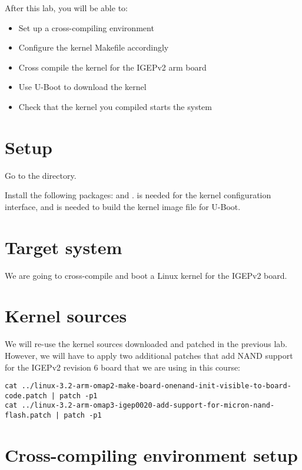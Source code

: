 
After this lab, you will be able to:
\begin{itemize}
\item Set up a cross-compiling environment
\item Configure the kernel Makefile accordingly
\item Cross compile the kernel for the IGEPv2 arm board
\item Use U-Boot to download the kernel
\item Check that the kernel you compiled starts the system
\end{itemize}

\section{Setup}

Go to the  directory.

Install the following packages:  and
.  is needed for the
 kernel configuration interface, and 
is needed to build the  kernel image file for U-Boot.

\section{Target system}

We are going to cross-compile and boot a Linux kernel for the IGEPv2
board.

\section{Kernel sources}

We will re-use the kernel sources downloaded and patched in the
previous lab. However, we will have to apply two additional patches
that add NAND support for the IGEPv2 revision 6 board that we are
using in this course:

\small
\begin{verbatim}
cat ../linux-3.2-arm-omap2-make-board-onenand-init-visible-to-board-code.patch | patch -p1
cat ../linux-3.2-arm-omap3-igep0020-add-support-for-micron-nand-flash.patch | patch -p1
\end{verbatim}
\normalsize

\section{Cross-compiling environment setup}

